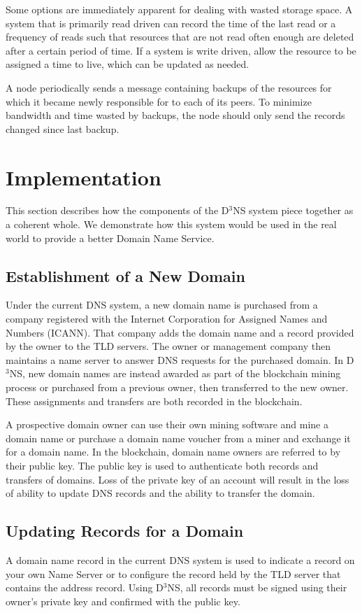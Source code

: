 \documentclass[11pt]{IEEEtran} %
\begin{document}
Some options are immediately apparent for dealing with wasted storage space. A system that is primarily read driven can record the time of the last read or a frequency of reads such that resources that are not read often enough are deleted after a certain period of time. If a system is write driven, allow the resource to be assigned a time to live, which can be updated as needed.

A node periodically sends a message containing backups of the resources for which it became newly responsible for to each of its peers. To minimize bandwidth and time wasted by backups, the node should only send the records changed since last backup.



\section{Implementation}
This section describes how the components of the D$^3$NS system piece together as a coherent whole.  We demonstrate how this system would be used in the real world to provide a better Domain Name Service.


\subsection{Establishment of a New Domain}
Under the current DNS system, a new domain name is purchased from a company registered with the Internet Corporation for Assigned Names and Numbers (ICANN). That company adds the domain name and a record provided by the owner to the TLD servers. The owner or management company then maintains a name server to answer DNS requests for the purchased domain. In D$^{3}$NS, new domain names are instead awarded as part of the blockchain mining process or purchased from a previous owner, then transferred to the new owner. These assignments and transfers are both recorded in the blockchain. 

A prospective domain owner can use their own mining software and mine a domain name or purchase a domain name voucher from a miner and exchange it for a domain name. In the blockchain, domain name owners are referred to by their public key. The public key is used to authenticate both records and transfers of domains. Loss of the private key of an account will result in the loss of ability to update DNS records and the ability to transfer the domain. 


\subsection{Updating Records for a Domain}
A domain name record in the current DNS system is used to indicate a record on your own Name Server or to configure the record held by the TLD server that contains the address record. Using D$^3$NS, all records must be signed using their owner's private key and confirmed with the public key. 
\end{document}

